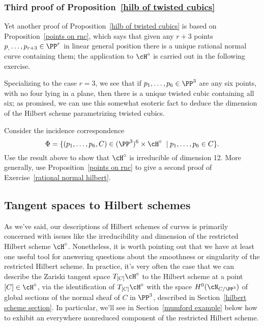 \subsubsection{Third proof of Proposition~\ref{hilb of twisted cubics}}

Yet another proof of Proposition~\ref{hilb of twisted cubics} is based on Proposition~\ref{points on rnc}, which says that given any $r+3$ points $p_,\dots,p_{r+3} \in \PP^r$ in linear general position there is a unique rational normal curve containing them; the application to $\cH^\circ$ is carried out in the following exercise. 

Specializing to the case $r=3$, we see that if $p_1,\dots,p_6 \in \PP^3$ are any six points, with no four lying in a plane, then there is a unique twisted cubic containing all six; as promised, we can use this somewhat esoteric fact to deduce the dimension of the Hilbert scheme parametrizing twisted cubics.

\begin{exercise}
Consider the incidence correspondence
$$
\Phi = \{ (p_1,\dots,p_6, C) \in (\PP^3)^6 \times \cH^\circ \; \mid p_1,\dots,p_6 \in C  \}.
$$
Use the result above to show that $\cH^\circ$ is irreducible of dimension 12. More generally, use Proposition~\ref{points on rnc} to give a second proof of Exercise~\ref{rational normal hilbert}.
\end{exercise}

\subsection{Tangent spaces to Hilbert schemes}

As we've said, our descriptions of Hilbert schemes of curves is primarily concerned with issues like the irreducibility and dimension of the restricted Hilbert scheme $\cH^\circ$. Nonetheless, it is worth pointing out that we have at least one useful tool for answering questions about the smoothness or singularity of the restricted Hilbert scheme. In practice, it's very often the case that we can describe the Zariski tangent space $T_{[C]}\cH^\circ$ to the Hilbert scheme at a point $[C] \in \cH^\circ$, via the identification of $T_{[C]}\cH^\circ$ with the space $H^0(\cN_{C/\PP^3})$ of global sections of the normal sheaf of $C$ in $\PP^3$, described in Section~\ref{hilbert scheme section}.  In particular, we'll see in Section~\ref{mumford example} below how to exhibit an everywhere nonreduced component of the restricted Hilbert scheme.

